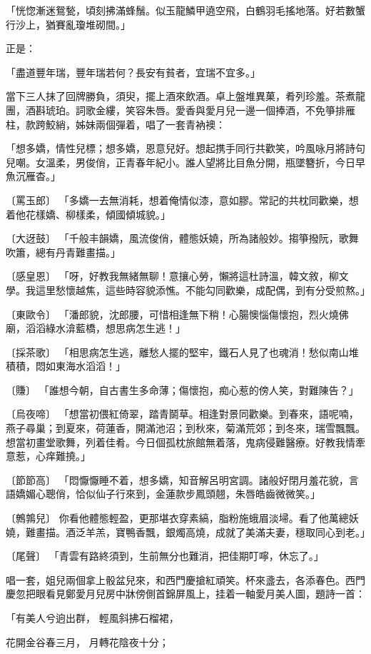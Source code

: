 \begin{showcontents}{}
「恍惚漸迷鴛甃，頃刻拂滿蜂鬚。似玉龍鱗甲遶空飛，白鶴羽毛搖地落。好若數蟹行沙上，猶賽亂瓊堆砌間。」

正是：

「盡道豐年瑞，豐年瑞若何？長安有貧者，宜瑞不宜多。」

當下三人抹了回牌勝負，須臾，擺上酒來飲酒。卓上盤堆異菓，肴列珍羞。茶煮龍團，酒斟琥珀。詞歌金縷，笑容朱唇。愛香與愛月兒一邊一個捧酒，不免箏排雁柱，款跨鮫綃，姊妹兩個彈着，唱了一套青衲襖：

「想多嬌，情性兒標；想多嬌，恩意兒好。想起携手同行共歡笑，吟風咏月將詩句兒嘲。女溫柔，男俊俏，正青春年紀小。誰人望將比目魚分開，瓶墜簪折，今日早魚沉雁杳。」

〔罵玉郎〕 「多嬌一去無消耗，想着俺情似漆，意如膠。常記的共枕同歡樂，想着他花樣嬌、柳樣柔，傾國傾城貌。」

〔大迓鼓〕 「千般丰韻嬌，風流俊俏，體態妖嬈，所為諸般妙。搊箏撥阮，歌舞吹簫，總有丹青難畫描。」

〔感皇恩〕 「呀，好教我無緒無聊！意攘心勞，懶將這杜詩溫，韓文敘，柳文學。我這里愁懷越焦，這些時容貌添憔。不能勾同歡樂，成配偶，到有分受煎熬。」

〔東歐令〕 「潘郎貌，沈郎腰，可惜相逢無下稍！心腸懊惱傷懷抱，烈火燒佛廟，滔滔綠水渰藍橋，想思病怎生逃！」

〔採茶歌〕 「相思病怎生逃，離愁人擺的堅牢，鐵石人見了也魂消！愁似南山堆積積，悶如東海水滔滔！」

〔賺〕 「誰想今朝，自古書生多命薄；傷懷抱，痴心惹的傍人笑，對難陳告？」

〔烏夜啼〕 「想當初偎紅倚翠，踏青鬬草。相逢對景同歡樂。到春來，語呢喃，燕子尋巢；到夏來，荷蓮香，開滿池沼；到秋來，菊滿荒郊；到冬來，瑞雪飄飄。想當初畫堂歌舞，列着佳肴。今日個孤枕旅館無着落，鬼病侵難醫療。好教我情牽意惹，心痒難撓。」

〔節節高〕 「悶懨懨睡不着，想多嬌，知音解呂明宮調。諸般好閉月羞花貌，言語嬌媚心聰俏，恰似仙子行來到，金蓮款步鳳頭翹，朱唇皓齒微微笑。」

〔鷯鶉兒〕 你看他體態輕盈，更那堪衣穿素縞，脂粉施蛾眉淡埽。看了他萬總妖嬈，難畫描。酒泛羊羔，寶鴨香飄，銀燭高燒，成就了美滿夫妻，穩取同心到老。」

〔尾聲〕 「青雲有路終須到，生前無分也難消，把佳期叮嚀，休忘了。」

唱一套，姐兒兩個拿上骰盆兒來，和西門慶搶紅頑笑。杯來盞去，各添春色。西門慶忽把眼看見鄭愛月兒房中牀傍側首錦屏風上，挂着一軸愛月美人圖，題詩一首：

「有美人兮逈出群，  輕風斜拂石榴裙，

花開金谷春三月，  月轉花陰夜十分；


\end{showcontents}
